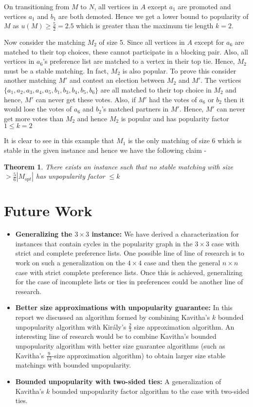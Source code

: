 \documentclass[a4paper,10pt]{article}
\theoremstyle{plain} %
\newtheorem{theorem}{Theorem}[section] %
\theoremstyle{plain} %
\begin{document}
On transitioning from $M$ to $N$, all vertices in $A$ except $a_1$ are promoted and vertices $a_1$ and $b_1$ are both demoted. Hence we get a lower bound to popularity of $M$ as $u(M) \geq \frac{5}{2} = 2.5$ which is greater than the maximum tie length $k = 2$.

Now consider the matching $M_2$ of size 5. Since all vertices in $A$ except for $a_6$ are matched to their top choices, these cannot participate in a blocking pair. Also, all vertices in $a_6$'s preference list are matched to a vertex in their top tie. Hence, $M_2$ must be a stable matching. In fact, $M_2$ is also popular. To prove this consider another matching $M'$ and contest an election between $M_2$ and $M'$. The vertices $\{a_1, a_2, a_3, a_4, a_5, b_1, b_3, b_4, b_5, b_6\}$ are all matched to their top choice in $M_2$ and hence, $M'$ can never get these votes. Also, if $M'$ had the votes of $a_6$ or $b_2$ then it would lose the votes of $a_6$ and $b_2$'s matched partners in $M'$. Hence, $M'$ can never get more votes than $M_2$ and hence $M_2$ is popular and has popularity factor $1 \leq k = 2$

It is clear to see in this example that $M_1$ is the only matching of size 6 which is stable in the given instance and hence we have the following claim - 

\begin{theorem}
    There exists an instance such that no stable matching with size $> \frac{5}{6}|M_{opt}|$ has unpopularity factor $ \leq k$
\end{theorem}

\section{Future Work}
\begin{itemize}
    \item \textbf{Generalizing the $3 \times 3$ instance:} We have derived a characterization for instances that contain cycles in the popularity graph in the $3 \times 3$ case with strict and complete preference lists. One possible line of line of research is to work on such a generalization on the $4 \times 4$ case and then the general $n \times n$ case with strict complete preference lists. Once this is achieved, generalizing for the case of incomplete lists or ties in preferences could be another line of research.
    \item \textbf{Better size approximations with unpopularity guarantee:} In this report we discussed an algorithm formed by combining Kavitha's $k$ bounded unpopularity algorithm with Király's $\frac{2}{3}$ size approximation algorithm. An interesting line of research would be to combine Kavitha's bounded unpopularity algorithm with better size guarantee algorithms (such as Kavitha's $\frac{9}{13}$-size approximation algorithm) to obtain larger size stable matchings with bounded unpopularity.
    \item \textbf{Bounded unpopularity with two-sided ties:} A generalization of Kavitha's $k$ bounded unpopularity factor algorithm to the case with two-sided ties.
\end{itemize}
\end{document}
